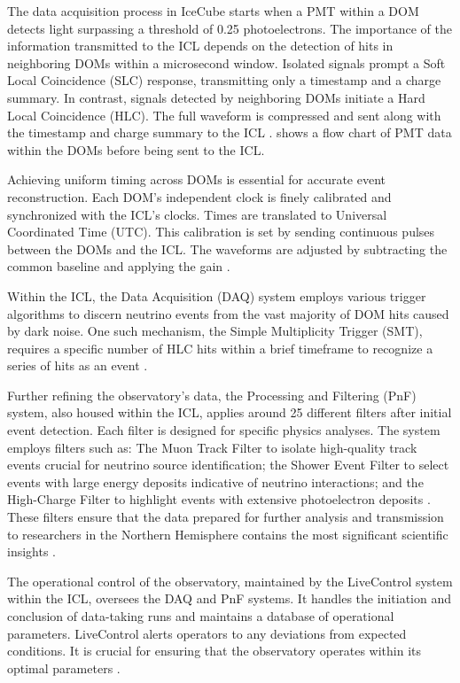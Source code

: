 The data acquisition process in IceCube starts when a PMT within a DOM detects light surpassing a threshold of 0.25 photoelectrons.
The importance of the information transmitted to the ICL depends on the detection of hits in neighboring DOMs within a microsecond window.
Isolated signals prompt a Soft Local Coincidence (SLC) response, transmitting only a timestamp and a charge summary.
In contrast, signals detected by neighboring DOMs initiate a Hard Local Coincidence (HLC).
The full waveform is compressed and sent along with the timestamp and charge summary to the ICL \cite{IC3_thedetector}.
 shows a flow chart of PMT data within the DOMs before being sent to the ICL.

Achieving uniform timing across DOMs is essential for accurate event reconstruction.
Each DOM's independent clock is finely calibrated and synchronized with the ICL's clocks.
Times are translated to Universal Coordinated Time (UTC).
This calibration is set by sending continuous pulses between the DOMs and the ICL.
The waveforms are adjusted by subtracting the common baseline and applying the gain \cite{IC3_thedetector}.

Within the ICL, the Data Acquisition (DAQ) system employs various trigger algorithms to discern neutrino events from the vast majority of DOM hits caused by dark noise.
One such mechanism, the Simple Multiplicity Trigger (SMT), requires a specific number of HLC hits within a brief timeframe to recognize a series of hits as an event \cite{IC3_thedetector}.

Further refining the observatory's data, the Processing and Filtering (PnF) system, also housed within the ICL, applies around 25 different filters after initial event detection.
Each filter is designed for specific physics analyses.
The system employs filters such as: The Muon Track Filter to isolate high-quality track events crucial for neutrino source identification;
the Shower Event Filter to select events with large energy deposits indicative of neutrino interactions;
and the High-Charge Filter to highlight events with extensive photoelectron deposits \cite{IC3_thedetector}.
These filters ensure that the data prepared for further analysis and transmission to researchers in the Northern Hemisphere contains the most significant scientific insights \cite{IC3_thedetector}.

The operational control of the observatory, maintained by the LiveControl system within the ICL, oversees the DAQ and PnF systems.
It handles the initiation and conclusion of data-taking runs and maintains a database of operational parameters.
LiveControl alerts operators to any deviations from expected conditions.
It is crucial for ensuring that the observatory operates within its optimal parameters \cite{IC3_thedetector}.

